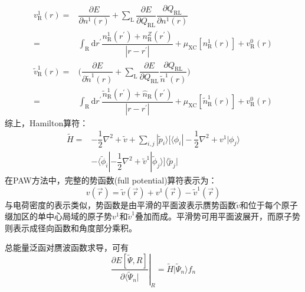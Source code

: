 \begin{equation}
	\begin{aligned}
		v_{\mathrm R}^1(r)=&\dfrac{\partial E}{\partial n^1(r)}+\sum_{\mathrm L}\dfrac{\partial E}{\partial Q_{\mathrm{RL}}}\dfrac{\partial Q_{\mathrm{RL}}}{\partial n^1(r)}\\
		=&\int_{\mathrm R}\mathrm{d}r^{\prime}\dfrac{n_{\mathrm R}^1(r^{\prime})+n_{\mathrm R}^Z(r^{\prime})}{|r-r^{\prime}|}+\mu_{\mathrm{XC}}[n_{\mathrm R}^1(r)]+v_{\mathrm R}^0(r)
	\end{aligned}
	\label{eq:PAW-Blochl-v1_R}
\end{equation}
\begin{equation}
	\begin{aligned}
		\tilde v_{\mathrm R}^1(r)=&\bigg(\dfrac{\partial E}{\partial\tilde n^1(r)}+\sum_{\mathrm L}\dfrac{\partial E}{\partial Q_{\mathrm{RL}}}\dfrac{\partial Q_{\mathrm{RL}}}{\tilde n^1(r)})\\
		=&\int_{\mathrm R}\mathrm{d}r^{\prime}\dfrac{\tilde n_{\mathrm R}^1(r^{\prime})+\hat n_{\mathrm R}(r^{\prime})}{|r-r^{\prime}|}+\mu_{\mathrm{XC}}[\tilde n_{\mathrm R}^1(r)]+v_{\mathrm R}^0(r)
	\end{aligned}
	\label{eq:PAW-Blochl-tv1_R}
\end{equation}
综上，\textrm{Hamilton}算符：
\begin{equation}
	\begin{aligned}
		\tilde H=&-\dfrac12\nabla^2+\tilde v+\sum_{i,j}|\tilde p_i\rangle\bigg[\langle\phi_i|-\dfrac12\nabla^2+v^1|\phi_j\rangle\\
			&-\langle\tilde\phi_i|-\dfrac12\nabla^2+\tilde v^1|\tilde\phi_j\rangle\bigg]\langle\tilde p_j| 
	\end{aligned}
	\label{eq:PAW-Blochl-15}
\end{equation}
在\textrm{PAW}方法中，完整的势函数\textrm{(full potential)}算符表示为：
\begin{equation}
	v(\vec r)=\tilde v(\vec r)+v^1(\vec r)-\tilde v^1(\vec r)
	\label{eq:PAW-Blochl-16}
\end{equation}
与电荷密度的表示类似，势函数是由平滑的平面波表示赝势函数$\tilde v$和位于每个原子缀加区的单中心局域的原子势$v^1$和$\tilde v^1$叠加而成。平滑势可用平面波展开，而原子势则表示成径向函数和角度部分乘积。

总能量泛函对赝波函数求导，可有
\begin{equation}
	\left.\dfrac{\partial E[\tilde\Psi, R]}{\partial\langle\tilde\Psi_n|}\right|_R=\tilde H|\tilde\Psi_n\rangle f_n
	\label{eq:PAW-Blochl-17}
\end{equation}

